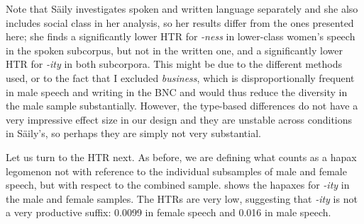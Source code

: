 Note that S\"{a}ily investigates spoken  and written language separately and she also includes social class in her analysis, so her results differ from the ones presented here; she finds a significantly lower HTR  for \textit{-ness} in lower\hyp{}class women's speech in the spoken subcorpus, but not in the written one, and a significantly lower HTR for \textit{-ity} in both subcorpora. This might be due to the different methods used, or to the fact that I excluded \textit{business}, which is disproportionally frequent in male speech and writing in the BNC  and would thus reduce the diversity in the male sample substantially. However, the type\hyp{}based  differences do not have a very impressive effect size  in our design  and they are unstable across conditions in S\"{a}ily's, so perhaps they are simply not very substantial.

Let us turn to the HTR  next. As before, we are defining what counts as a hapax  legomenon not with reference to the individual subsamples of male and female speech, but with respect to the combined sample.  shows the hapaxes for \textit{-ity} in the male and female samples. The HTRs are very low, suggesting that \textit{-ity} is not a very productive  suffix:  0.0099 in female speech and 0.016 in male speech.

